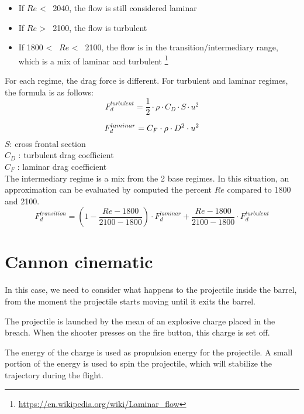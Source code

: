 \documentclass[12pt,a4paper]{article}
\begin{document}
\begin{itemize}
	\item If $Re$ <~ 2040, the flow is still considered laminar 
	\item If $Re$ >~ 2100, the flow is turbulent
	\item If 1800 <~ $Re$ <~ 2100, the flow is in the transition/intermediary range, which is a mix of laminar and turbulent \footnote{\url{https://en.wikipedia.org/wiki/Laminar_flow}}
\end{itemize}

For each regime, the drag force is different. 
For turbulent and laminar regimes, the formula is as follows:
\begin{equation}
	F_d^{turbulent} = \frac{1}{2} \cdot \rho \cdot C_D \cdot S \cdot u^2
\end{equation}

\begin{equation}
	F_d^{laminar} = C_F \cdot \rho \cdot  D^2 \cdot u^2\\
\end{equation}
$S$: cross frontal section\\
$C_D$ : turbulent drag coefficient\\
$C_F$ : laminar drag coefficient\\

The intermediary regime is a mix from the 2 base regimes. In this situation, an approximation can be evaluated by computed the percent $Re$ compared to 1800 and 2100. 
\begin{equation}
	F_d^{transition} = (1- \frac{Re - 1800}{2100-1800}) \cdot F_d^{laminar} + \frac{Re - 1800}{2100-1800} \cdot F_d^{turbulent}
\end{equation}

\section{Cannon cinematic}
In this case, we need to consider what happens to the projectile inside the barrel, from the moment the projectile starts moving until it exits the barrel. 

The projectile is launched by the mean of an explosive charge placed in the breach. 
When the shooter presses on the fire button, this charge is set off. 

The energy of the charge is used as propulsion energy for the projectile. A small portion of the energy is used to spin the projectile, which will stabilize the trajectory during the flight. 
\end{document}
